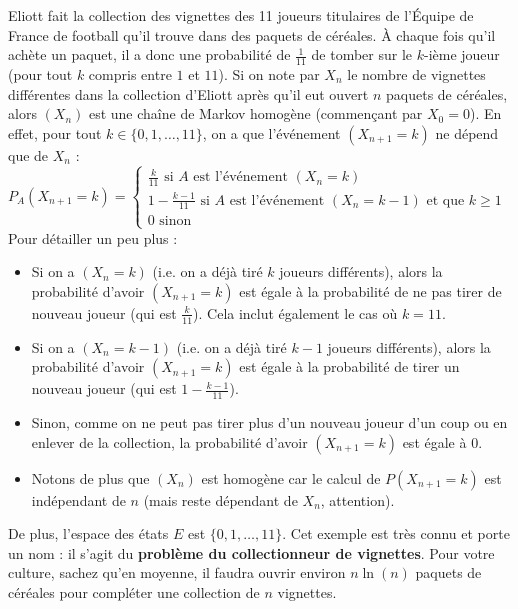 	\begin{tip}[Exemple]
		\contentwidth[big]
		Eliott fait la collection des vignettes des 11 joueurs titulaires de l'Équipe de France de football qu'il trouve dans des paquets de céréales. À chaque fois qu'il achète un paquet, il a donc une probabilité de $\frac{1}{11}$ de tomber sur le $k$-ième joueur (pour tout $k$ compris entre $1$ et $11$).
		\newpar
		Si on note par $X_n$ le nombre de vignettes différentes dans la collection d'Eliott après qu'il eut ouvert $n$ paquets de céréales, alors $(X_n)$ est une chaîne de Markov homogène (commençant par $X_0 = 0$). En effet, pour tout $k \in \{0, 1, \dots, 11\}$, on a que l'événement $(X_{n+1} = k)$ ne dépend que de $X_n$ :
		\newpar
		$\displaystyle{P_A(X_{n+1} = k) = \begin{cases}
				\frac{k}{11} \text{ si } A \text{ est l'événement } (X_n = k) \\
				1 - \frac{k-1}{11} \text{ si } A \text{ est l'événement } (X_n = k-1) \text{ et que } k \geq 1 \\
				0 \text{ sinon}
		\end{cases}}$
		\newpar
		Pour détailler un peu plus :
		\begin{itemize}
			\item Si on a $(X_n = k)$ (i.e. on a déjà tiré $k$ joueurs différents), alors la probabilité d'avoir $(X_{n+1} = k)$ est égale à la probabilité de ne pas tirer de nouveau joueur (qui est $\frac{k}{11}$). Cela inclut également le cas où $k = 11$.
			\item Si on a $(X_n = k-1)$ (i.e. on a déjà tiré $k-1$ joueurs différents), alors la probabilité d'avoir $(X_{n+1} = k)$ est égale à la probabilité de tirer un nouveau joueur (qui est $1 - \frac{k-1}{11}$).
			\item Sinon, comme on ne peut pas tirer plus d'un nouveau joueur d'un coup ou en enlever de la collection, la probabilité d'avoir $(X_{n+1} = k)$ est égale à $0$.
			\item Notons de plus que $(X_n)$ est homogène car le calcul de $P(X_{n+1} = k)$ est indépendant de $n$ (mais reste dépendant de $X_n$, attention).
		\end{itemize}
		De plus, l'espace des états $E$ est $\{0, 1, \dots, 11\}$.
		\newpar
		Cet exemple est très connu et porte un nom : il s'agit du \textbf{problème du collectionneur de vignettes}. Pour votre culture, sachez qu'en moyenne, il faudra ouvrir environ $n \ln(n)$ paquets de céréales pour compléter une collection de $n$ vignettes.
	\end{tip}
	
